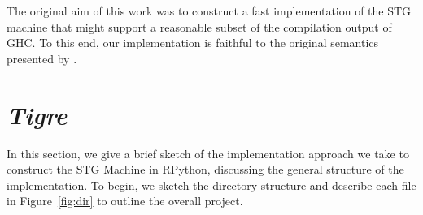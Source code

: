 \documentclass[preprint]{sigplanconf}
\begin{document}
The original aim of this work was to construct a fast implementation of the
STG machine that might support a reasonable subset of the compilation output
of GHC. To this end, our implementation is faithful to the original semantics
presented by \citet{spj:stgmachine}.

\section{\emph{Tigre}} %

In this section, we give a brief sketch of the implementation approach we take
to construct the STG Machine in RPython, discussing the general structure of the
implementation. To begin, we sketch the directory structure and describe each file
in Figure~\ref{fig:dir} to outline the overall project.
\end{document}
